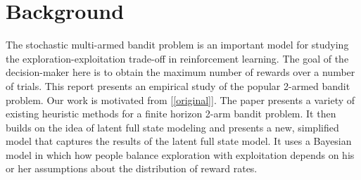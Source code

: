 \section{Background}
\label{background}

The stochastic multi-armed bandit problem is an important model for studying the exploration-exploitation trade-off in reinforcement learning. The goal of the decision-maker here is to obtain the maximum number of rewards over a number of trials. This report presents an empirical study of the popular 2-armed bandit problem. Our work is motivated from [\ref{original}]. The paper presents a variety of existing heuristic methods for a finite horizon 2-arm bandit problem. It then builds on the idea of latent full state modeling and presents a new, simplified model that captures the results of the latent full state model. It uses a Bayesian model in which how people balance exploration with exploitation depends on his or her assumptions about the distribution of reward rates. 



 